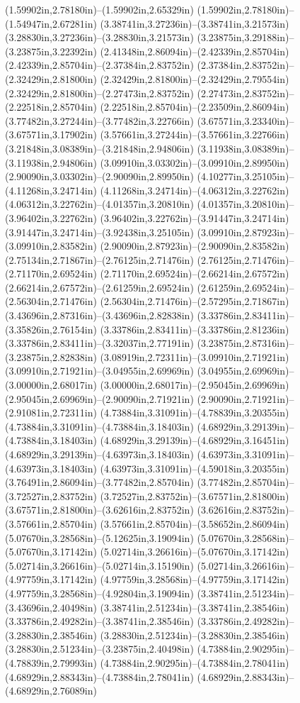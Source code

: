 (1.59902in,2.78180in)--(1.59902in,2.65329in) (1.59902in,2.78180in)--(1.54947in,2.67281in) (3.38741in,3.27236in)--(3.38741in,3.21573in) (3.28830in,3.27236in)--(3.28830in,3.21573in) (3.23875in,3.29188in)--(3.23875in,3.22392in) (2.41348in,2.86094in)--(2.42339in,2.85704in) (2.42339in,2.85704in)--(2.37384in,2.83752in) (2.37384in,2.83752in)--(2.32429in,2.81800in) (2.32429in,2.81800in)--(2.32429in,2.79554in) (2.32429in,2.81800in)--(2.27473in,2.83752in) (2.27473in,2.83752in)--(2.22518in,2.85704in) (2.22518in,2.85704in)--(2.23509in,2.86094in) (3.77482in,3.27244in)--(3.77482in,3.22766in) (3.67571in,3.23340in)--(3.67571in,3.17902in) (3.57661in,3.27244in)--(3.57661in,3.22766in) (3.21848in,3.08389in)--(3.21848in,2.94806in) (3.11938in,3.08389in)--(3.11938in,2.94806in) (3.09910in,3.03302in)--(3.09910in,2.89950in) (2.90090in,3.03302in)--(2.90090in,2.89950in) (4.10277in,3.25105in)--(4.11268in,3.24714in) (4.11268in,3.24714in)--(4.06312in,3.22762in) (4.06312in,3.22762in)--(4.01357in,3.20810in) (4.01357in,3.20810in)--(3.96402in,3.22762in) (3.96402in,3.22762in)--(3.91447in,3.24714in) (3.91447in,3.24714in)--(3.92438in,3.25105in) (3.09910in,2.87923in)--(3.09910in,2.83582in) (2.90090in,2.87923in)--(2.90090in,2.83582in) (2.75134in,2.71867in)--(2.76125in,2.71476in) (2.76125in,2.71476in)--(2.71170in,2.69524in) (2.71170in,2.69524in)--(2.66214in,2.67572in) (2.66214in,2.67572in)--(2.61259in,2.69524in) (2.61259in,2.69524in)--(2.56304in,2.71476in) (2.56304in,2.71476in)--(2.57295in,2.71867in) (3.43696in,2.87316in)--(3.43696in,2.82838in) (3.33786in,2.83411in)--(3.35826in,2.76154in) (3.33786in,2.83411in)--(3.33786in,2.81236in) (3.33786in,2.83411in)--(3.32037in,2.77191in) (3.23875in,2.87316in)--(3.23875in,2.82838in) (3.08919in,2.72311in)--(3.09910in,2.71921in) (3.09910in,2.71921in)--(3.04955in,2.69969in) (3.04955in,2.69969in)--(3.00000in,2.68017in) (3.00000in,2.68017in)--(2.95045in,2.69969in) (2.95045in,2.69969in)--(2.90090in,2.71921in) (2.90090in,2.71921in)--(2.91081in,2.72311in) (4.73884in,3.31091in)--(4.78839in,3.20355in) (4.73884in,3.31091in)--(4.73884in,3.18403in) (4.68929in,3.29139in)--(4.73884in,3.18403in) (4.68929in,3.29139in)--(4.68929in,3.16451in) (4.68929in,3.29139in)--(4.63973in,3.18403in) (4.63973in,3.31091in)--(4.63973in,3.18403in) (4.63973in,3.31091in)--(4.59018in,3.20355in) (3.76491in,2.86094in)--(3.77482in,2.85704in) (3.77482in,2.85704in)--(3.72527in,2.83752in) (3.72527in,2.83752in)--(3.67571in,2.81800in) (3.67571in,2.81800in)--(3.62616in,2.83752in) (3.62616in,2.83752in)--(3.57661in,2.85704in) (3.57661in,2.85704in)--(3.58652in,2.86094in) (5.07670in,3.28568in)--(5.12625in,3.19094in) (5.07670in,3.28568in)--(5.07670in,3.17142in) (5.02714in,3.26616in)--(5.07670in,3.17142in) (5.02714in,3.26616in)--(5.02714in,3.15190in) (5.02714in,3.26616in)--(4.97759in,3.17142in) (4.97759in,3.28568in)--(4.97759in,3.17142in) (4.97759in,3.28568in)--(4.92804in,3.19094in) (3.38741in,2.51234in)--(3.43696in,2.40498in) (3.38741in,2.51234in)--(3.38741in,2.38546in) (3.33786in,2.49282in)--(3.38741in,2.38546in) (3.33786in,2.49282in)--(3.28830in,2.38546in) (3.28830in,2.51234in)--(3.28830in,2.38546in) (3.28830in,2.51234in)--(3.23875in,2.40498in) (4.73884in,2.90295in)--(4.78839in,2.79993in) (4.73884in,2.90295in)--(4.73884in,2.78041in) (4.68929in,2.88343in)--(4.73884in,2.78041in) (4.68929in,2.88343in)--(4.68929in,2.76089in) 